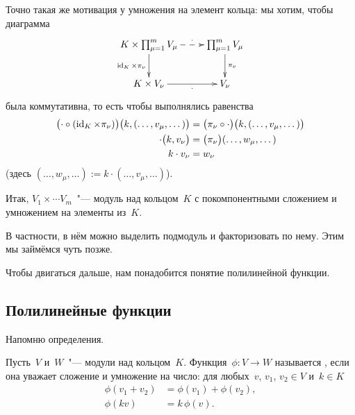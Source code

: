 Точно такая же мотивация у умножения на элемент кольца: мы хотим, чтобы диаграмма
\[
	\xymatrix{
		K \times 
		\prod_{\mu=1}^m
		V_\mu
		\ar @{-->} [r] ^-{\cdot}
		\ar [d] _-{\id_K \times \pi_\nu}
		&
		\prod_{\mu=1}^m
		V_\mu
		\ar [d] ^-{\pi_\nu}
		\\
		K \times V_\nu
		\ar [r] _-{\cdot}
		&
		V_\nu
	}
\]
была коммутативна, то есть чтобы выполнялись равенства
\begin{align*}
	\bigl(
		\cdot
		\circ
		(\mathop{\mathrm{id}}\nolimits_K \times \pi_\nu)
	\bigr)
	\bigl(
		k, 
		(\dots, v_\mu, \dots)
	\bigr)
	&=
	\bigl(
		\pi_\nu
		\circ
		\cdot
	\bigr)
	\bigl(
		k, 
		(\dots, v_\mu, \dots)
	\bigr)
	\\
	\cdot
	\bigl(
		k, 
		v_\nu
	\bigr)
	&=
	\bigl(
		\pi_\nu
	\bigr)
	(\dots, w_\mu, \dots)
	\\
	k 
	\cdot
	v_\nu
	&=
	w_\nu
\end{align*}
(здесь $(\dots, w_\mu, \dots) := k\cdot (\dots, v_\mu, \dots)$).

% 		

Итак, $V_1 \times \cdots V_m$~"--- модуль над кольцом~$K$ с покомпонентными сложением и умножением на элементы из~$K$. 

В частности, в нём можно выделить подмодуль и факторизовать по нему. Этим мы займёмся чуть позже.

Чтобы двигаться дальше, нам понадобится понятие полилинейной функции.

\subsection{Полилинейные функции}

Напомню определения.

\begin{definition}
	Пусть~$V$ и~$W$~"--- модули над кольцом~$K$. Функция~$\phi \colon V \to W$ называется , если она уважает сложение и умножение на число: для любых~$v$, $v_1$, $v_2 \in V$ и~$k \in K$
	\begin{align*}
		\phi(v_1 + v_2) &= \phi(v_1) + \phi(v_2), \\
		\phi(kv) &= k\,\phi(v).
	\end{align*}
\end{definition}

